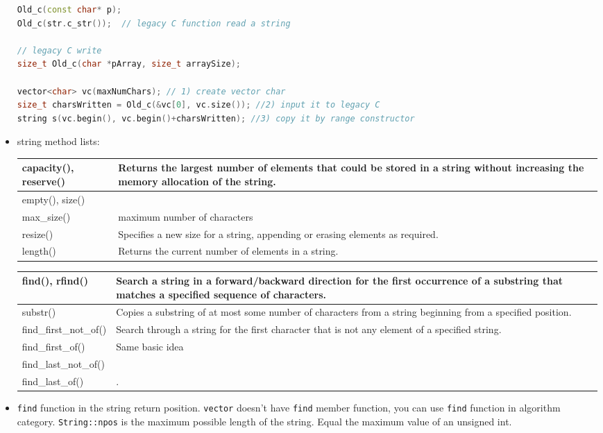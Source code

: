 \documentclass[a4paper,11pt,twoside]{book}
\newcommand{\tophline}{\hline }
\newcommand{\bottomhline}{\\ \hline }
\newcommand{\tophline}{ }
\newcommand{\bottomhline}{ }
\begin{document}
\begin{itemize}
\begin{lstlisting}[frame=single, language=c++]
Old_c(const char* p); 
Old_c(str.c_str());  // legacy C function read a string
	
// legacy C write
size_t Old_c(char *pArray, size_t arraySize); 
	
vector<char> vc(maxNumChars); // 1) create vector char
size_t charsWritten = Old_c(&vc[0], vc.size()); //2) input it to legacy C
string s(vc.begin(), vc.begin()+charsWritten); //3) copy it by range constructor
\end{lstlisting}
	
	\item string method lists:
	
	\begin{tabular}{| p{} |p{}|}
		\tophline
		capacity(), reserve() & Returns the largest number of elements that could be stored in a string without increasing the memory allocation of the string.\\
		\tophline
		empty(),  size()& \\
		\tophline
		max\_size() & maximum number of characters \\
		resize() & Specifies a new size for a string, appending or erasing elements as required.\\
		\tophline
		length() & Returns the current number of elements in a string.\bottomhline
		
	\end{tabular}
	
	\begin{tabular}{| p{} |p{}|}
		\tophline
		find(), rfind() & Search a string in a forward/backward direction for the first occurrence of a substring that matches a specified sequence of characters.\\
		\tophline
		substr() & Copies a substring of at most some number of characters from a string beginning from a specified position. \\
		
		\tophline
		find\_first\_not\_of()& Search through a string for the first character that is not any element of a specified string.\\
		\tophline
		find\_first\_of() & Same basic idea\\
		\tophline
		find\_last\_not\_of() & \\
		\tophline
		find\_last\_of() & .\bottomhline
	\end{tabular}
	
	\item \texttt{find} function in the string return position. \texttt{vector} doesn't have \texttt{find} member function, you can use \texttt{find} function in  algorithm category. \texttt{String::npos} is the maximum possible length of the string. Equal the maximum value of an unsigned int.
	

\end{itemize}
\end{document}
